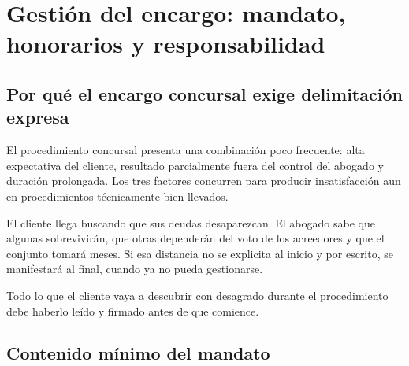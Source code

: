 \chapter{Gestión del encargo: mandato, honorarios y responsabilidad}
\label{cap:gestion-encargo}


\section{Por qué el encargo concursal exige delimitación expresa}

El procedimiento concursal presenta una combinación poco frecuente: alta expectativa del
cliente, resultado parcialmente fuera del control del abogado y duración prolongada. Los
tres factores concurren para producir insatisfacción aun en procedimientos técnicamente
bien llevados.

El cliente llega buscando que sus deudas desaparezcan. El abogado sabe que algunas
sobrevivirán, que otras dependerán del voto de los acreedores y que el conjunto tomará
meses. Si esa distancia no se explicita al inicio y por escrito, se manifestará al final,
cuando ya no pueda gestionarse.

\begin{foco}
Todo lo que el cliente vaya a descubrir con desagrado durante el procedimiento debe
haberlo leído y firmado antes de que comience.
\end{foco}

\section{Contenido mínimo del mandato}

